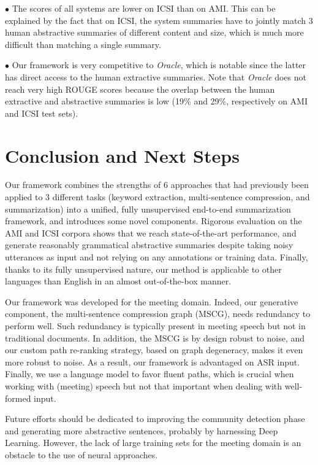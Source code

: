 \documentclass[11pt,a4paper]{article}
\begin{document}
\noindent $\bullet$ The scores of all systems are lower on ICSI than on AMI. This can be explained by the fact that on ICSI, the system summaries have to jointly match 3 human abstractive summaries of different content and size, which is much more difficult than matching a single summary.

\noindent $\bullet$ Our framework is very competitive to \textit{Oracle}, which is notable since the latter has direct access to the human extractive summaries. Note that \textit{Oracle} does not reach very high ROUGE scores because the overlap between the human extractive and abstractive summaries is low (19\% and 29\%, respectively on AMI and ICSI test sets).


\section{Conclusion and Next Steps}
\vspace{-0.1cm}
Our framework combines the strengths of 6 approaches that had previously been applied to 3 different tasks (keyword extraction, multi-sentence compression, and summarization) into a unified, fully unsupervised end-to-end summarization framework, and introduces some novel components. Rigorous evaluation on the AMI and ICSI corpora shows that we reach state-of-the-art performance, and generate reasonably grammatical abstractive summaries despite taking noisy utterances as input and not relying on any annotations or training data. Finally, thanks to its fully unsupervised nature, our method is applicable to other languages than English in an almost out-of-the-box manner.

Our framework was developed for the meeting domain. Indeed, our generative component, the multi-sentence compression graph (MSCG), needs redundancy to perform well. Such redundancy is typically present in meeting speech but not in traditional documents. In addition, the MSCG is by design robust to noise, and our custom path re-ranking strategy, based on graph degeneracy, makes it even more robust to noise. As a result, our framework is advantaged on ASR input. Finally, we use a language model to favor fluent paths, which is crucial when working with (meeting) speech but not that important when dealing with well-formed input.

Future efforts should be dedicated to improving the community detection phase and generating more abstractive sentences, probably by harnessing Deep Learning. However, the lack of large training sets for the meeting domain is an obstacle to the use of neural approaches.
\end{document}

